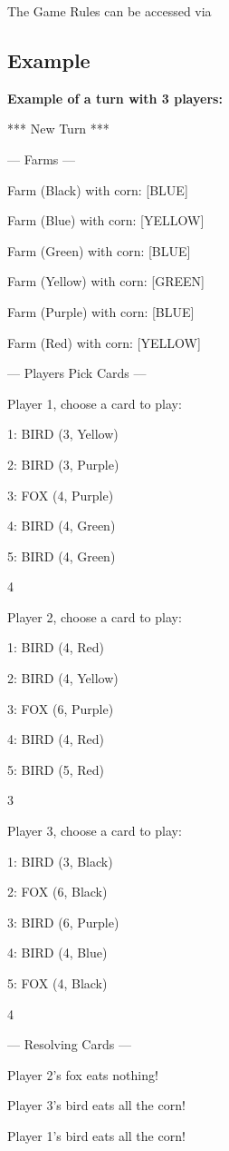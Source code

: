 \documentclass[conference]{IEEEtran}
\begin{document}
The Game Rules can be accessed via \cite{b1}

\subsection{Example}

\textbf{Example of a turn with 3 players:}

\vspace{0.2cm}

*** New Turn ***

--- Farms ---

Farm (Black) with corn: [BLUE]

Farm (Blue) with corn: [YELLOW]

Farm (Green) with corn: [BLUE]

Farm (Yellow) with corn: [GREEN]

Farm (Purple) with corn: [BLUE]

Farm (Red) with corn: [YELLOW]

--- Players Pick Cards ---

Player 1, choose a card to play:

1: BIRD (3, Yellow)

2: BIRD (3, Purple)

3: FOX (4, Purple)

4: BIRD (4, Green)

5: BIRD (4, Green)

4

Player 2, choose a card to play:

1: BIRD (4, Red)

2: BIRD (4, Yellow)

3: FOX (6, Purple)

4: BIRD (4, Red)

5: BIRD (5, Red)

3

Player 3, choose a card to play:

1: BIRD (3, Black)

2: FOX (6, Black)

3: BIRD (6, Purple)

4: BIRD (4, Blue)

5: FOX (4, Black)

4

--- Resolving Cards ---

Player 2's fox eats nothing!

Player 3's bird eats all the corn!

Player 1's bird eats all the corn!
\end{document}

